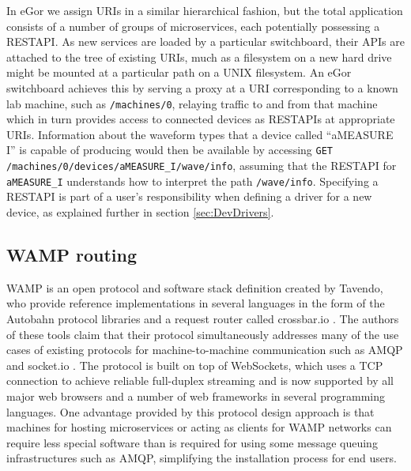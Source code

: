 \documentclass[../thesis]{subfiles}
\begin{document}
In eGor we assign URIs in a similar hierarchical fashion, but the
total application consists of a number of groups of microservices,
each potentially possessing a \gls{RESTAPI}. As new services are
loaded by a particular switchboard, their \glspl{API} are attached to
the tree of existing \glspl{URI}, much as a filesystem on a new hard
drive might be mounted at a particular path on a UNIX filesystem.  An
eGor switchboard achieves this by serving a proxy at a \gls{URI}
corresponding to a known lab machine, such as \texttt{/machines/0},
relaying traffic to and from that machine which in turn provides
access to connected devices as \glspl{RESTAPI} at appropriate
\glspl{URI}. Information about the waveform types that a device called
``aMEASURE I'' is capable of producing would then be available by
accessing \texttt{GET /machines/0/devices/aMEASURE\_I/wave/info},
assuming that the \gls{RESTAPI} for \texttt{aMEASURE\_I} understands
how to interpret the path \texttt{/wave/info}. Specifying a
\gls{RESTAPI} is part of a user's responsibility when defining a
driver for a new device, as explained further in section
\ref{sec:DevDrivers}.

\subsection{WAMP routing}
\gls{WAMP} is an open protocol and software stack definition created
by Tavendo, who provide reference implementations in several languages
in the form of the Autobahn protocol libraries and a request router
called crossbar.io \cite{CrossbarIO}. The authors of these tools claim
that their protocol simultaneously addresses many of the use cases of
existing protocols for machine-to-machine communication such as
\gls{AMQP} and socket.io \cite{socket.io}. The protocol is built on
top of WebSockets, which uses a TCP connection to achieve reliable
full-duplex streaming and is now supported by all major web browsers
and a number of web frameworks in several programming languages. One
advantage provided by this protocol design approach is that machines
for hosting microservices or acting as clients for \gls{WAMP} networks
can require less special software than is required for using some
message queuing infrastructures such as \gls{AMQP}, simplifying the
installation process for end users.
\end{document}
